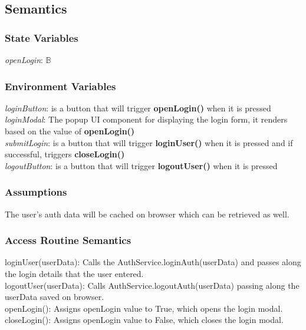 \documentclass[12pt, titlepage]{article}
\begin{document}
	\subsection{Semantics}
	
	\subsubsection{State Variables}
	\textit{openLogin}: $\mathbb{B}$ \\
	
	\subsubsection{Environment Variables}
	\textit{loginButton}: is a button that will trigger \textbf{openLogin()} when it is pressed \\
	\textit{loginModal}: The popup UI component for displaying the login form, it renders based on the value of \textbf{openLogin()} \\
	\textit{submitLogin}: is a button that will trigger \textbf{loginUser()} when it is pressed and if successful, triggers \textbf{closeLogin()} \\
	\textit{logoutButton}: is a button that will trigger \textbf{logoutUser()} when it is pressed \\
	
	
	\subsubsection{Assumptions}
	The user's auth data will be cached on browser which can be retrieved as well.
	
	\subsubsection{Access Routine Semantics}
	
	\noindent loginUser(userData): Calls the AuthService.loginAuth(userData) and passes along the login details that the user entered. \\
	
	\noindent logoutUser(userData): Calls AuthService.logoutAuth(userData) passing along the userData saved on browser. \\
	
	\noindent openLogin(): Assigns openLogin value to True, which opens the login modal. \\
	
	\noindent closeLogin(): Assigns openLogin value to False, which closes the login modal. \\\\
	
\end{document}

